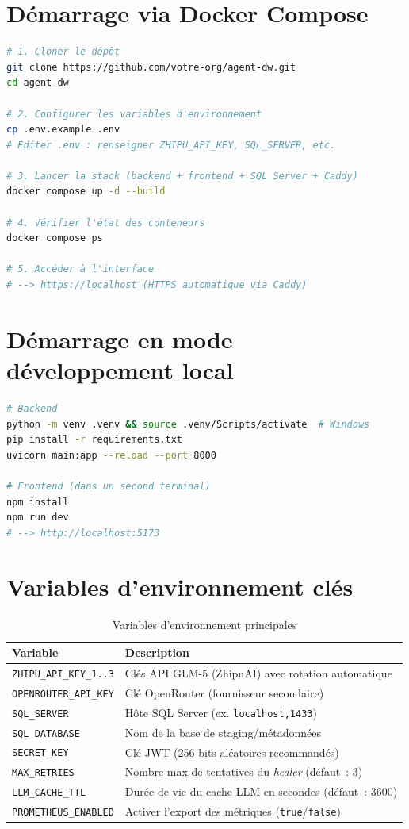 \documentclass[12pt, a4paper]{report}
\begin{document}
\section{Démarrage via Docker Compose}
\begin{lstlisting}[language=bash, caption={Démarrage de la stack complète}]
# 1. Cloner le dépôt
git clone https://github.com/votre-org/agent-dw.git
cd agent-dw

# 2. Configurer les variables d'environnement
cp .env.example .env
# Editer .env : renseigner ZHIPU_API_KEY, SQL_SERVER, etc.

# 3. Lancer la stack (backend + frontend + SQL Server + Caddy)
docker compose up -d --build

# 4. Vérifier l'état des conteneurs
docker compose ps

# 5. Accéder à l'interface
# --> https://localhost (HTTPS automatique via Caddy)
\end{lstlisting}

\section{Démarrage en mode développement local}
\begin{lstlisting}[language=bash, caption={Mode développement sans Docker}]
# Backend
python -m venv .venv && source .venv/Scripts/activate  # Windows
pip install -r requirements.txt
uvicorn main:app --reload --port 8000

# Frontend (dans un second terminal)
npm install
npm run dev
# --> http://localhost:5173
\end{lstlisting}

\section{Variables d'environnement clés}
\begin{table}[H]
\centering
\caption{Variables d'environnement principales}
\label{tab:env}
\begin{tabular}{lp{8cm}}
\toprule
\textbf{Variable} & \textbf{Description} \\
\midrule
\texttt{ZHIPU\_API\_KEY\_1..3} & Clés API GLM-5 (ZhipuAI) avec rotation automatique \\
\texttt{OPENROUTER\_API\_KEY} & Clé OpenRouter (fournisseur secondaire) \\
\texttt{SQL\_SERVER} & Hôte SQL Server (ex. \texttt{localhost,1433}) \\
\texttt{SQL\_DATABASE} & Nom de la base de staging/métadonnées \\
\texttt{SECRET\_KEY} & Clé JWT (256 bits aléatoires recommandés) \\
\texttt{MAX\_RETRIES} & Nombre max de tentatives du \emph{healer} (défaut~: 3) \\
\texttt{LLM\_CACHE\_TTL} & Durée de vie du cache LLM en secondes (défaut~: 3600) \\
\texttt{PROMETHEUS\_ENABLED} & Activer l'export des métriques (\texttt{true}/\texttt{false}) \\
\bottomrule
\end{tabular}
\end{table}
\end{document}
